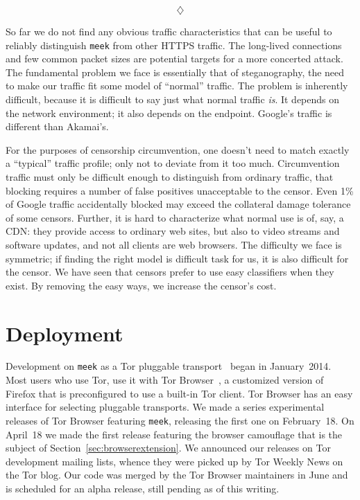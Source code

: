 \documentclass[conference]{IEEEtran}
\newcommand{\meek}{\texttt{meek}\xspace}
\newcommand{\lbl}{ResearchLab\xspace}
\begin{document}


$$\diamondsuit$$

So far we do not find any obvious traffic characteristics that can be useful to reliably distinguish \meek
from other HTTPS traffic.
The long-lived connections and few common packet sizes are
potential targets for a more concerted attack.
The fundamental problem we face is essentially that of steganography,
the need to make our traffic fit some model of ``normal'' traffic.
The problem is inherently difficult,
because it is difficult to say just what normal traffic \emph{is}.
It depends on the network environment;
it also depends on the endpoint.
Google's traffic is different than Akamai's.

For the purposes of censorship circumvention,
one doesn't need to match exactly a ``typical'' traffic profile;
only not to deviate from it too much.
Circumvention traffic must only be difficult enough to distinguish from ordinary traffic,
that blocking requires a number of false positives unacceptable to the censor.
Even 1\% of Google traffic accidentally blocked may exceed the collateral damage tolerance of some censors.
Further, it is hard to characterize what normal use is of, say, a CDN:
they provide access to ordinary web sites,
but also to video streams and software updates,
and not all clients are web browsers.
The difficulty we face is symmetric;
if finding the right model is difficult task for us,
it is also difficult for the censor.
We have seen that censors prefer to use easy classifiers when they exist.
By removing the easy ways, we increase the censor's cost.

\section{Deployment}
\label{sec:deployment}

Development on \meek as a Tor pluggable transport~\cite{pt} began in January~2014.
Most users who use Tor, use it with Tor Browser~\cite{torbrowser},
a customized version of Firefox that is
preconfigured to use a built-in Tor client.
Tor Browser has an easy interface for selecting pluggable transports.
We made a series experimental releases of Tor Browser featuring \meek,
releasing the first one on February~18.
On April~18 we made the first release featuring the browser camouflage
that is the subject of Section~\ref{sec:browserextension}.
We announced our releases on Tor development mailing lists,
whence they were picked up by Tor Weekly News on the Tor blog.
Our code was merged by the Tor Browser maintainers
in June and is scheduled for an alpha release,
still pending as of this writing.
\end{document}
